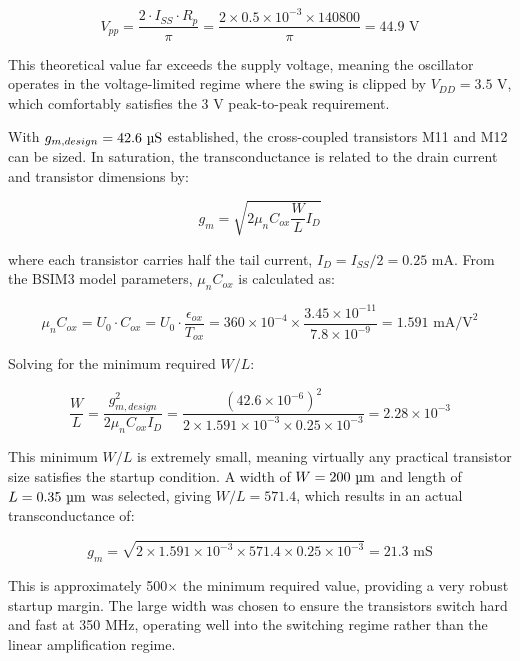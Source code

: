 \documentclass[12pt]{article}
\begin{document}
\begin{equation}
V_{pp} = \frac{2 \cdot I_{SS} \cdot R_p}{\pi} = \frac{2 \times 0.5 \times 10^{-3} \times 140800}{\pi} = 44.9 \text{ V}
\end{equation}

This theoretical value far exceeds the supply voltage, meaning the oscillator operates in the voltage-limited regime where the swing is clipped by $V_{DD} = 3.5 \text{ V}$, which comfortably satisfies the 3 V peak-to-peak requirement.

With $g_{m,design} = 42.6 \text{ \textmu S}$ established, the cross-coupled transistors M11 and M12 can be sized. In saturation, the transconductance is related to the drain current and transistor dimensions by:

\begin{equation}
g_m = \sqrt{2 \mu_n C_{ox} \frac{W}{L} I_D}
\end{equation}

where each transistor carries half the tail current, $I_D = I_{SS}/2 = 0.25 \text{ mA}$. From the BSIM3 model parameters, $\mu_n C_{ox}$ is calculated as:

\begin{equation}
\mu_n C_{ox} = U_0 \cdot C_{ox} = U_0 \cdot \frac{\epsilon_{ox}}{T_{ox}} = 360 \times 10^{-4} \times \frac{3.45 \times 10^{-11}}{7.8 \times 10^{-9}} = 1.591 \text{ mA/V}^2
\end{equation}

Solving for the minimum required $W/L$:

\begin{equation}
\frac{W}{L} = \frac{g_{m,design}^2}{2 \mu_n C_{ox} I_D} = \frac{(42.6 \times 10^{-6})^2}{2 \times 1.591 \times 10^{-3} \times 0.25 \times 10^{-3}} = 2.28 \times 10^{-3}
\end{equation}

This minimum $W/L$ is extremely small, meaning virtually any practical transistor size satisfies the startup condition. A width of $W = 200 \text{ \textmu m}$ and length of $L = 0.35 \text{ \textmu m}$ was selected, giving $W/L = 571.4$, which results in an actual transconductance of:

\begin{equation}
g_m = \sqrt{2 \times 1.591 \times 10^{-3} \times 571.4 \times 0.25 \times 10^{-3}} = 21.3 \text{ mS}
\end{equation}

This is approximately 500$\times$ the minimum required value, providing a very robust startup margin. The large width was chosen to ensure the transistors switch hard and fast at 350 MHz, operating well into the switching regime rather than the linear amplification regime.
\newpage
\end{document}
